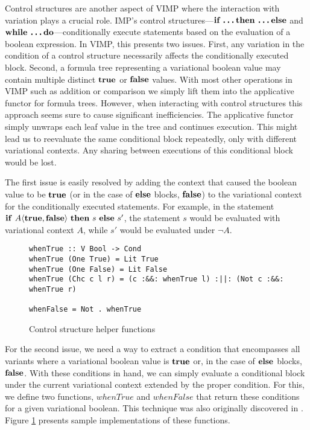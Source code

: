 \documentclass[12pt,oneside]{book}
\newcommand{\tagtree}[3]{#1 \langle #2, #3 \rangle}
\begin{document}
Control structures are another aspect of VIMP where the interaction with variation plays a crucial role. IMP's control structures---$\textbf{\textup{\textrm{if \ldots then \ldots else}}}$ and $\textbf{\textup{\textrm{while \ldots do}}}$---conditionally execute statements based on the evaluation of a boolean expression. In VIMP, this presents two issues. First, any variation in the condition of a control structure
necessarily affects the conditionally executed block. Second, a formula tree representing a variational boolean
value may contain multiple distinct $\textbf{\textup{\textrm{true}}}$ or $\textbf{\textup{\textrm{false}}}$ values. With most other operations in VIMP such as addition or comparison we simply lift them into the applicative functor for formula trees.
However, when interacting with control structures this approach seems sure to cause significant inefficiencies. The applicative functor simply unwraps each leaf value in the tree
and continues execution. This might lead us to reevaluate the same conditional block repeatedly, only with different variational contexts. Any sharing between executions of this
conditional block would be lost. 

The first issue is easily resolved by adding the context that caused the boolean value to be $\textbf{\textup{\textrm{true}}}$ (or in the case of $\textbf{\textup{\textrm{else}}}$ blocks, $\textbf{\textup{\textrm{false}}}$)
to the variational context for the conditionally executed statements. For example, in the statement
$\CCkeyw{if}\ \tagtree{A}{\CCkeyw{true}}{\CCkeyw{false}}\ \CCkeyw{then}\ s\ \CCkeyw{else}\ s'$, the statement $s$ would be evaluated with variational context $A$, while
$s'$ would be evaluated under $\neg A$.

\begin{figure}
\begin{lstlisting}
whenTrue :: V Bool -> Cond
whenTrue (One True) = Lit True
whenTrue (One False) = Lit False
whenTrue (Chc c l r) = (c :&&: whenTrue l) :||: (Not c :&&: whenTrue r)

whenFalse = Not . whenTrue
\end{lstlisting}
\caption{Control structure helper functions}
\label{fig:when}
\end{figure}

For the second issue, we need a way to extract a condition that encompasses all variants where a variational boolean value is $\textbf{\textup{\textrm{true}}}$ or, in the case of $\textbf{\textup{\textrm{else}}}$ blocks,
$\textbf{\textup{\textrm{false}}}$. With these conditions in hand, we can simply evaluate a conditional block under the current variational context extended by the proper condition. For this, we define two functions, $\mathit{whenTrue}$ and $\mathit{whenFalse}$ that return these conditions for a given variational boolean.
This technique was also originally discovered in \cite{varwhile}.  Figure \ref{fig:when} presents sample implementations of these functions.
\end{document}
